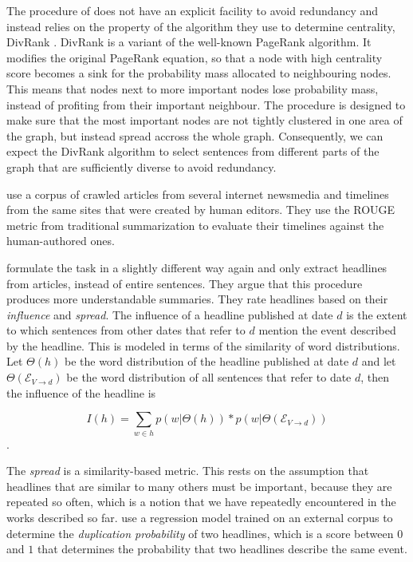 \documentclass[a4paper,BCOR=10mm]{report}
\numberwithin{lemma}{chapter}
\numberwithin{definition}{chapter}
\begin{document}
The procedure of \citet{yan-trans} does not have an explicit facility to avoid redundancy and instead relies on the property of the algorithm they use to determine centrality, DivRank \citep{divrank}. DivRank is a variant of the well-known PageRank \citep{pagerank} algorithm. It modifies the original PageRank equation, so that a node with high centrality score becomes a sink for the probability mass allocated to neighbouring nodes. This means that nodes next to more important nodes lose probability mass, instead of profiting from their important neighbour. The procedure is designed to make sure that the most important nodes are not tightly clustered in one area of the graph, but instead spread accross the whole graph. Consequently, we can expect the DivRank algorithm to select sentences from different parts of the graph that are sufficiently diverse to avoid redundancy.

\citet{yan-trans} use a corpus of crawled articles from several internet newsmedia and timelines from the same sites that were created by human editors.
They use the ROUGE \citep{rouge} metric from traditional summarization to evaluate their timelines against the human-authored ones.

\citet{tran-headlines} formulate the task in a slightly different way again and only extract headlines from articles, instead of entire sentences. They argue that this procedure produces more understandable summaries.
They rate headlines based on their \textit{influence} and \textit{spread}.
The influence of a headline published at date $d$ is the extent to which sentences from other dates that refer to $d$ mention the event described by the headline.
This is modeled in terms of the similarity of word distributions. Let $\Theta(h)$ be the word distribution of the headline published at date $d$ and let $\Theta(\mathcal{E}_{V \rightarrow d})$ be the word distribution of all sentences that refer to date $d$, then the influence of the headline is

\begin{equation}
I(h) = \sum_{w \in h} p(w|\Theta(h)) * p(w|\Theta(\mathcal{E}_{V \rightarrow d}))
\end{equation}.

The \textit{spread} is a similarity-based metric. This rests on the assumption that headlines that are similar to many others must be important, because they are repeated so often, which is a notion that we have repeatedly encountered in the works described so far.
\citeauthor{tran-headlines} use a regression model trained on an external corpus to determine the \textit{duplication probability} of two headlines, which is a score between $0$ and $1$ that determines the probability that two headlines describe the same event.
\end{document}
